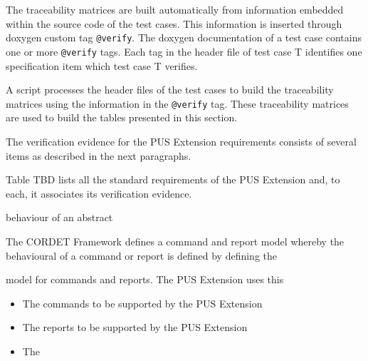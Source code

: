 \documentclass{pnp_article}
\begin{document}
The traceability matrices are built automatically from information embedded within the source code of the test cases. This information is inserted through doxygen custom tag \texttt{@verify}. The doxygen documentation of a test case contains one or more \texttt{@verify} tags. Each tag in the header file of test case T identifies one specification item which test case T verifies. 

A script processes the header files of the test cases to build the traceability matrices using the information in the \texttt{@verify} tag. These traceability matrices are used to build the tables presented in this section.



The verification evidence for the PUS Extension requirements consists of several items as described in the next paragraphs.

Table TBD lists all the standard requirements of the PUS Extension and, to each, it associates its verification evidence.



behaviour of an abstract




The CORDET Framework defines a command and report model whereby the behavioural of a command or report is defined by defining the 


model for commands and reports. The PUS Extension uses this 

\begin{itemize}
\item The commands to be supported by the PUS Extension
\item The reports to be supported by the PUS Extension
\item The 
\end{itemize}






\end{document}
